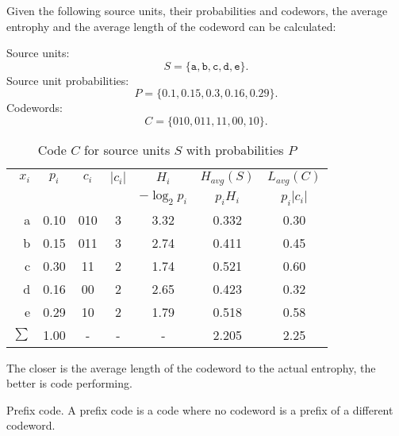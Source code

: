 Given the following source units, their probabilities and codewors, the average entrophy and the average length of the codeword can be calculated:

\noindent
Source units:
$$S = \{\texttt{a}, \texttt{b}, \texttt{c}, \texttt{d}, \texttt{e}\}.$$
Source unit probabilities:
$$P = \{0.1, 0.15, 0.3, 0.16, 0.29\}.$$
Codewords:
$$C = \{010, 011, 11, 00, 10\}.$$

\begin{table}
  \begin{center}
    \begin{tabular}{|r|cccccc|}
      \hline
      $x_i$ & $p_i$ & $c_i$ & $|c_i|$ & $H_i$ & $H_{avg}(S)$ & $L_{avg}(C)$      \\
          &        &        &          & $-\log_2 p_i$ & $p_i H_i$ & $p_i |c_i|$      \\
      \hline
      a          & 0.10   & 010    & 3        & 3.32  & 0.332        & 0.30              \\  
      b          & 0.15   & 011    & 3        & 2.74  & 0.411        & 0.45              \\
      c          & 0.30   & 11     & 2        & 1.74  & 0.521        & 0.60              \\
      d          & 0.16   & 00     & 2        & 2.65  & 0.423        & 0.32              \\
      e          & 0.29   & 10     & 2        & 1.79  & 0.518        & 0.58              \\
      \hline
      $\sum$     & 1.00   & -      & -        & -     & 2.205        & 2.25              \\
      \hline
    \end{tabular}
  \end{center}
  \caption{Code $C$ for source units $S$ with probabilities $P$}
\end{table}

The closer is the average length of the codeword to the actual entrophy, the better is code performing.



\begin{dt}{Prefix code.}
  A prefix code is a code where no codeword is a prefix of a different codeword.
\end{dt}

